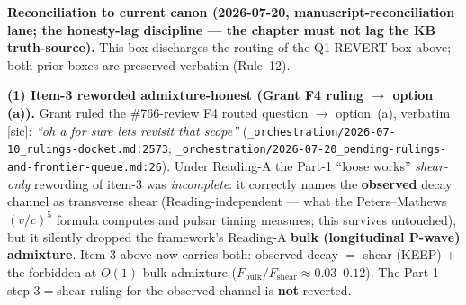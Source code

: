 \begin{warningbox}
\textbf{Reconciliation to current canon (2026-07-20, manuscript-reconciliation lane; the
honesty-lag discipline --- the chapter must not lag the KB truth-source).} This box discharges the
routing of the Q1 REVERT box above; both prior boxes are preserved verbatim (Rule~12).

\medskip
\noindent\textbf{(1) Item-3 reworded admixture-honest (Grant F4 ruling $\to$ option (a)).} Grant
ruled the \#766-review F4 routed question $\to$ option~(a), verbatim [sic]: \emph{``oh a for sure
lets revisit that scope''} (\texttt{\_orchestration/2026-07-10\_rulings-docket.md:2573};
\texttt{\_orchestration/2026-07-20\_pending-rulings-and-frontier-queue.md:26}). Under Reading-A the
Part-1 ``loose works'' \emph{shear-only} rewording of item-3 was \emph{incomplete}: it correctly
names the \textbf{observed} decay channel as transverse shear (Reading-independent --- what the
Peters--Mathews $(v/c)^5$ formula computes and pulsar timing measures; this survives untouched),
but it silently dropped the framework's Reading-A \textbf{bulk (longitudinal P-wave) admixture}.
Item-3 above now carries both: observed decay $=$ shear (KEEP) $+$ the forbidden-at-$O(1)$ bulk
admixture ($F_{\mathrm{bulk}}/F_{\mathrm{shear}} \approx 0.03$--$0.12$). The Part-1 step-3$=$shear
ruling for the observed channel is \textbf{not} reverted.


\end{warningbox}

